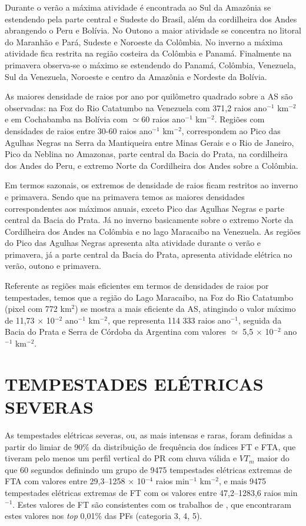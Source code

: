 Durante o verão a máxima atividade é encontrada ao Sul da Amazônia se estendendo pela parte central e Sudeste do Brasil, além da cordilheira dos Andes abrangendo o Peru e Bolívia. No Outono a maior atividade se concentra no litoral do Maranhão e Pará, Sudeste e Noroeste  da Colômbia. No inverno a máxima atividade  fica restrita na região costeira da Colômbia e Panamá. Finalmente na primavera observa-se o máximo se estendendo do Panamá, Colômbia, Venezuela, Sul da Venezuela, Noroeste e centro da Amazônia e Nordeste da Bolívia. 
 
As maiores densidade de raios por ano por quilômetro quadrado sobre a AS são observadas: na Foz do Rio Catatumbo na Venezuela com 371,2 raios ano$^{-1}$ km$^{-2}$ e em Cochabamba na Bolívia com $\simeq$60  raios ano$^{-1}$ km$^{-2}$. Regiões com densidades de raios entre 30-60 raios ano$^{-1}$ km$^{-2}$, correspondem ao Pico das Agulhas Negras na Serra da Mantiqueira entre Minas Gerais e o Rio de Janeiro, Pico da Neblina no Amazonas, parte central da Bacia do Prata, na cordilheira dos Andes do Peru, e extremo Norte da Cordilheira dos Andes sobre a Colômbia. 

Em termos sazonais, os extremos de densidade de raios ficam restritos ao inverno e primavera. Sendo que na primavera temos as maiores densidades correspondentes aos máximos anuais, exceto Pico das Agulhas Negras e parte central da Bacia do Prata. Já no inverno basicamente sobre o extremo Norte da Cordilheira dos Andes na Colômbia e no lago Maracaibo na Venezuela. As regiões do Pico das Agulhas Negras apresenta alta atividade durante o verão e primavera, já  a parte central da Bacia do Prata, apresenta atividade elétrica  no verão, outono e primavera.


Referente as regiões mais eficientes em termos de densidades de raios por tempestades, temos que a região do Lago Maracaibo, na Foz do Rio Catatumbo (pixel com 772 km$^{2}$) se mostra a mais eficiente da AS, atingindo o valor máximo de 11,73 $\times$ 10$^{-2}$ ano$^{-1}$ km$^{-2}$, que representa {114 333} raios ano$^{-1}$, seguida da Bacia do Prata e Serra de Córdoba da Argentina com valores $\simeq$ 5,5 $\times$ 10$^{-2}$ ano$^{-1}$ km$^{-2}$.


\section{TEMPESTADES ELÉTRICAS SEVERAS}

As tempestades elétricas severas, ou, as mais intensas e raras, foram definidas a partir do limiar de 90\% da distribuição de frequência dos índices FT e FTA, que tiveram pelo menos um perfil vertical do PR com chuva válida e $VT_m$ maior do que 60 segundos  definindo um grupo de 9475 tempestades elétricas extremas de FTA com valores entre 29,3--1258 $\times$ 10$^{-4}$ raios min$^{-1}$ km$^{-2}$, e mais 9475 tempestades elétricas extremas de FT com os valores entre 47,2--1283,6 raios min$^{-1}$.  Estes valores de FT são consistentes com os trabalhos de , que encontraram estes valores nos \textit{top} 0,01\% das PFs (categoria 3, 4, 5).


